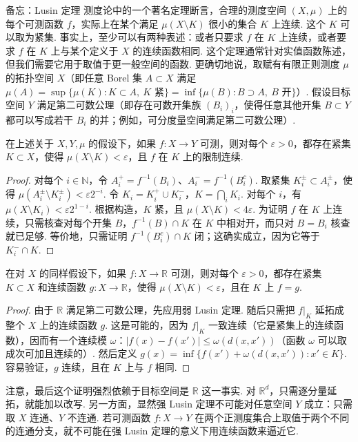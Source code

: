 \begin{sourcebox}{备忘：Lusin 定理}\label{box:1.6}
测度论中的一个著名定理断言，合理的测度空间 $(X,\mu)$ 上的每个可测函数 $f$，实际上在某个满足 $\mu(X\setminus K)$ 很小的集合 $K$ 上连续. 这个 $K$ 可以取为紧集. 事实上，至少可以有两种表述：或者只要求 $f$ 在 $K$ 上连续，或者要求 $f$ 在 $K$ 上与某个定义于 $X$ 的连续函数相同. 这个定理通常针对实值函数陈述，但我们需要它用于取值于更一般空间的函数. 更确切地说，取赋有有限正则测度 $\mu$ 的拓扑空间 $X$（即任意 Borel 集 $A\subset X$ 满足 $\mu(A)=\sup\{\mu(K):K\subset A,\ K\text{ 紧}\}=\inf\{\mu(B):B\supset A,\ B\text{ 开}\}$）. 假设目标空间 $Y$ 满足第二可数公理（即存在可数开集族 $(B_i)_i$，使得任意其他开集 $B\subset Y$ 都可以写成若干 $B_i$ 的并；例如，可分度量空间满足第二可数公理）.

\begin{theorem*}[弱Lusin定理]
在上述关于 $X,Y,\mu$ 的假设下，如果 $f:X\to Y$ 可测，则对每个 $\varepsilon>0$，都存在紧集 $K\subset X$，使得 $\mu(X\setminus K)<\varepsilon$，且 $f$ 在 $K$ 上的限制连续.
\end{theorem*}

\begin{proof}
对每个 $i\in\mathbb N$，令 $A_i^+=f^{-1}(B_i)$、$A_i^-=f^{-1}(B_i^c)$. 取紧集 $K_i^\pm\subset A_i^\pm$，使得 $\mu(A_i^\pm\setminus K_i^\pm)<\varepsilon2^{-i}$. 令 $K_i=K_i^+\cup K_i^-$，$K=\bigcap_i K_i$. 对每个 $i$，有 $\mu(X\setminus K_i)<\varepsilon2^{1-i}$. 根据构造，$K$ 紧，且 $\mu(X\setminus K)<4\varepsilon$. 为证明 $f$ 在 $K$ 上连续，只需核查对每个开集 $B$，$f^{-1}(B)\cap K$ 在 $K$ 中相对开，而只对 $B=B_i$ 核查就已足够. 等价地，只需证明 $f^{-1}(B_i^c)\cap K$ 闭；这确实成立，因为它等于 $K_i^-\cap K$.
\end{proof}

\begin{theorem*}[强Lusin定理]
在对 $X$ 的同样假设下，如果 $f:X\to\mathbb R$ 可测，则对每个 $\varepsilon>0$，都存在紧集 $K\subset X$ 和连续函数 $g:X\to\mathbb R$，使得 $\mu(X\setminus K)<\varepsilon$，且在 $K$ 上 $f=g$.
\end{theorem*}

\begin{proof}
由于 $\mathbb R$ 满足第二可数公理，先应用弱 Lusin 定理. 随后只需把 $f|_K$ 延拓成整个 $X$ 上的连续函数 $g$. 这是可能的，因为 $f|_K$ 一致连续（它是紧集上的连续函数），因而有一个连续模 $\omega$：$|f(x)-f(x')|\le\omega(d(x,x'))$（函数 $\omega$ 可以取成次可加且连续的）. 然后定义 $g(x)=\inf\{f(x')+\omega(d(x,x')):x'\in K\}$. 容易验证，$g$ 连续，且在 $K$ 上与 $f$ 相同.
\end{proof}

注意，最后这个证明强烈依赖于目标空间是 $\mathbb R$ 这一事实. 对 $\mathbb R^d$，只需逐分量延拓，就能加以改写. 另一方面，显然强 Lusin 定理不可能对任意空间 $Y$ 成立：只需取 $X$ 连通、$Y$ 不连通. 若可测函数 $f:X\to Y$ 在两个正测度集合上取值于两个不同的连通分支，就不可能在强 Lusin 定理的意义下用连续函数来逼近它.
\end{sourcebox}

